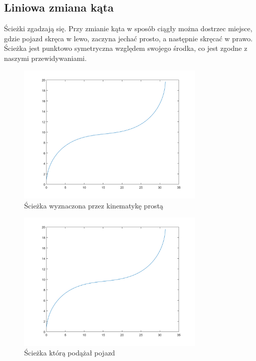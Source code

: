 \documentclass[a4paper, 12pt]{report}
\begin{document}
			\subsection{Liniowa zmiana kąta}
				Ścieżki zgadzają się. Przy zmianie kąta w sposób ciągły można dostrzec miejsce, gdzie pojazd skręca w lewo, zaczyna jechać prosto, a następnie skręcać w prawo. Ścieżka jest punktowo symetryczna względem swojego środka, co jest zgodne z naszymi przewidywaniami.
				\begin{figure}[H]
					\centering
					\includegraphics[width = 0.8\textwidth]{./AP/img/line_in_1.png}
					\caption{Ścieżka wyznaczona przez kinematykę prostą}
				\end{figure}
				\begin{figure}[H]
					\centering
					\includegraphics[width = 0.8\textwidth]{./AP/img/line_in_2.png}
					\caption{Ścieżka którą podążał pojazd}
				\end{figure}
\end{document}
